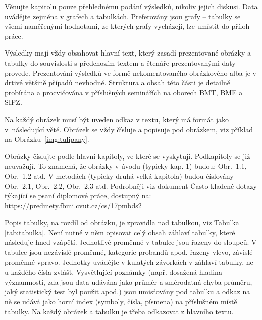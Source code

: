 Věnujte kapitolu pouze přehlednému podání výsledků, nikoliv jejich diskusi. 
Data uvádějte zejména v grafech a tabulkách. 
Preferovány jsou grafy – tabulky se všemi naměřenými hodnotami, ze kterých grafy vycházejí, lze umístit do příloh práce.

Výsledky mají vždy obsahovat hlavní text, který zasadí prezentované obrázky a tabulky do souvislosti s předchozím textem a čtenáře prezentovanými daty provede. 
Prezentování výsledků ve formě nekomentovaného obrázkového alba je v drtivé většině případů nevhodné.
Struktura a obsah této části je detailně probírána a procvičována v příslušných seminářích na oborech BMT, BME a SIPZ.

Na každý obrázek musí být uveden odkaz v textu, který má formát jako v~ná\-sle\-du\-jí\-cí větě. 
Obrázek se vždy čísluje a popisuje pod obrázkem, viz příklad na Obrázku~\ref{img:tulipany}.
 
 
Obrázky číslujte podle hlavní kapitoly, ve které se vyskytují. Podkapitoly se již neuvažují. 
To znamená, že obrázky v úvodu (typicky kap. 1) budou: Obr.~1.1, Obr.~1.2 atd. V metodách (typicky druhá velká kapitola) budou číslovány Obr.~2.1, Obr.~2.2, Obr.~2.3 atd. 
Podrobněji viz dokument Často kladené dotazy týkající se psaní diplomové práce, dostupný na:
\url{https://predmety.fbmi.cvut.cz/cs/17pmbds2}

Popis tabulky, na rozdíl od obrázku, je zpravidla nad tabulkou, viz Tabulka \ref{tab:tabulka}. 
Není nutné v něm opisovat celý obsah záhlaví tabulky, které následuje hned vzápětí. 
Jednotlivé proměnné v tabulce jsou řazeny do sloupců. 
V tabulce jsou nezávislé proměnné, kategorie probandů apod. řazeny vlevo, závislé proměnné vpravo. 
Jednotky uvádějte v kulatých závorkách v záhlaví tabulky, ne u každého čísla zvlášť. 
Vysvětlující poznámky (např. dosažená hladina významnosti, zda jsou data udávána jako průměr a směrodatná chyba průměru, jaký statistický test byl použit apod.) jsou umisťovány pod tabulku a odkaz na ně se udává jako horní index (symboly, čísla, písmena) na příslušném místě tabulky. 
Na každý obrázek a tabulku je třeba odkazovat z hlavního textu.

